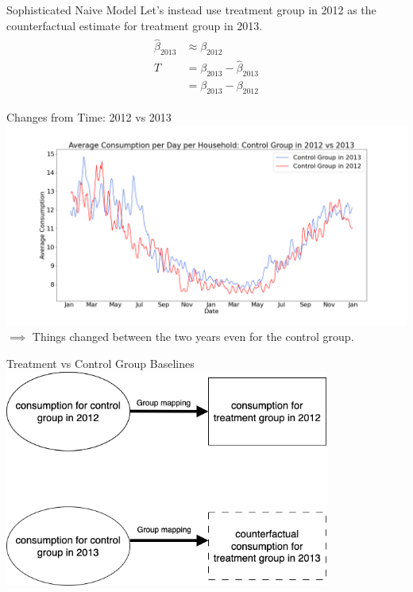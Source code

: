 \documentclass{beamer}
\begin{document}
\begin{frame}{Sophisticated Naive Model}
  Let's instead use treatment group in 2012 as the counterfactual estimate for treatment group in 2013.
  \begin{align}
    \begin{split}
      \hat\beta_{2013} & \approx \beta_{2012} \\
      T & = \beta_{2013} - \hat\beta_{2013} \\
        & = \beta_{2013} - \beta_{2012}
    \end{split}
  \end{align}
\end{frame}

\begin{frame}{Changes from Time: 2012 vs 2013}
  \centering
  \includegraphics[width=1\textwidth]{images/yoy-changes-control-group.png}
  $\implies$ Things changed between the two years even for the control group.
\end{frame}

\begin{frame}{Treatment vs Control Group Baselines}
  \centering
  \includegraphics[width=0.8\textwidth]{images/group-mapping.png}
\end{frame}
\end{document}
